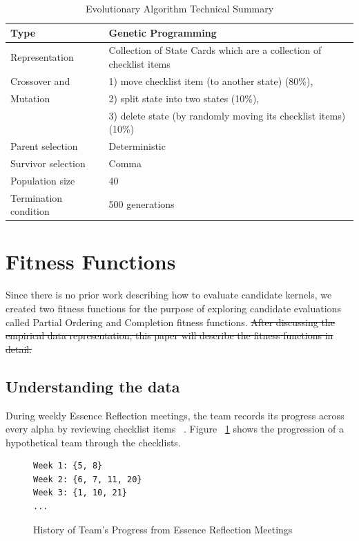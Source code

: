 \documentclass[preprint,12pt,3p]{elsarticle}
\begin{document}
\begin{table}[h]
\caption{Evolutionary Algorithm Technical Summary}
\label{TechnicalSummary}
\centering
\begin{tabular}{|p{1.70in}|p{4.30in}|}
\hline
{Type}  & {Genetic Programming} \\ \hline
{Representation} & {Collection of State Cards which are a collection of checklist items}  \\ \hline
{Crossover and} & {1) move checklist item (to another state) (80\%), } \\
{Mutation} & {2) split state into two states (10\%), } \\ 
{} & {3) delete state (by randomly moving its checklist items) (10\%) } \\ \hline
{Parent selection} & {Deterministic} \\ \hline
{Survivor selection}  & {Comma} \\ \hline
{Population size}  & {40} \\ \hline
{Termination \mbox{condition}} & {500 generations} \\ \hline
\end{tabular}
\end{table}

\section{Fitness Functions}

Since there is no prior work describing how to evaluate candidate kernels, we created two fitness functions for the purpose of exploring candidate evaluations called Partial Ordering and Completion fitness functions. \sout{After discussing the empirical data representation, this paper will describe the fitness functions in detail.} 

\subsection{Understanding the data}

During weekly Essence Reflection meetings, the team records its progress across every alpha by reviewing checklist items ~\cite{ICSE2014}. Figure ~\ref{history} shows the progression of a hypothetical team through the checklists.

\begin{figure}[!htb]
\begin{verbatim}
Week 1: {5, 8}
Week 2: {6, 7, 11, 20} 
Week 3: {1, 10, 21} 
...
\end{verbatim}
 \caption{History of Team's Progress from Essence Reflection Meetings}
 \label{history}
\end{figure}
\end{document}
